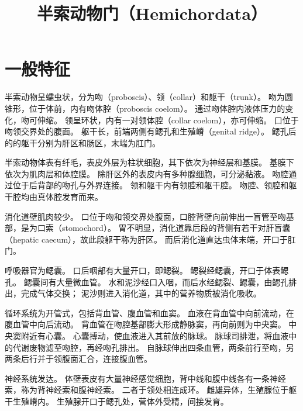 \documentclass[11pt]{article}
\title{半索动物门（Hemichordata）}
\date{}
\begin{document}
  \maketitle

  \linenumbers
  
\section{一般特征}
半索动物呈蠕虫状，分为吻（proboscis）、领（collar）和躯干（trunk）。
吻为圆锥形，位于体前，内有吻体腔（proboscis coelom）。
通过吻体腔内液体压力的变化，吻可伸缩。
领呈环状，内有一对领体腔（collar coelom），亦可伸缩。
口位于吻领交界处的腹面。
躯干长，前端两侧有鳃孔和生殖嵴（genital ridge）。
鳃孔后的的躯干分别为肝区和肠区，末端为肛门。

\newline

半索动物体表有纤毛，表皮外层为柱状细胞，其下依次为神经层和基膜。
基膜下依次为肌肉层和体腔膜。
除肝区外的表皮内有多种腺细胞，可分泌黏液。
吻腔通过位于后背部的吻孔与外界连接。
领和躯干内有领腔和躯干腔。
吻腔、领腔和躯干腔均由真体腔发育而来。

\newline

消化道壁肌肉较少。
口位于吻和领交界处腹面，口腔背壁向前伸出一盲管至吻基部，是为口索（stomochord）。
胃不明显，消化道靠后段的背侧有若干对肝盲囊（hepatic caecum），故此段躯干称为肝区。
而后消化道直达虫体末端，开口于肛门。

\newline

呼吸器官为鳃囊。
口后咽部有大量开口，即鳃裂。
鳃裂经鳃囊，开口于体表鳃孔。
鳃囊间有大量微血管。
水和泥沙经口入咽，而后水经鳃裂、鳃囊，由鳃孔排出，完成气体交换；
泥沙则进入消化道，其中的营养物质被消化吸收。

\newline

循环系统为开管式，包括背血管、腹血管和血窦。
血液在背血管中向前流动，在腹血管中向后流动。
背血管在吻腔基部膨大形成静脉窦，再向前则为中央窦。
中央窦附近有心囊。
心囊搏动，使血液进入其前放的脉球。
脉球司排泄，将血液中的代谢废物滤至吻腔，再经吻孔排出。
自脉球伸出四条血管，两条前行至吻，另两条后行并于领腹面汇合，连接腹血管。

\newline

神经系统发达。
体壁表皮有大量神经感觉细胞，背中线和腹中线各有一条神经索，称为背神经索和腹神经索。
二者于领处相连成环。
雌雄异体，生殖腺位于躯干生殖嵴内。
生殖腺开口于鳃孔处，营体外受精，间接发育。
\end{document}
